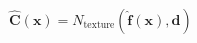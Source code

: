 $\mathbf{\hat{C}}(\mathbf{x})=N_{\mathrm{texture}}\left( \mathbf{\hat{f}}(\mathbf{x}),\mathbf{d} \right)$
